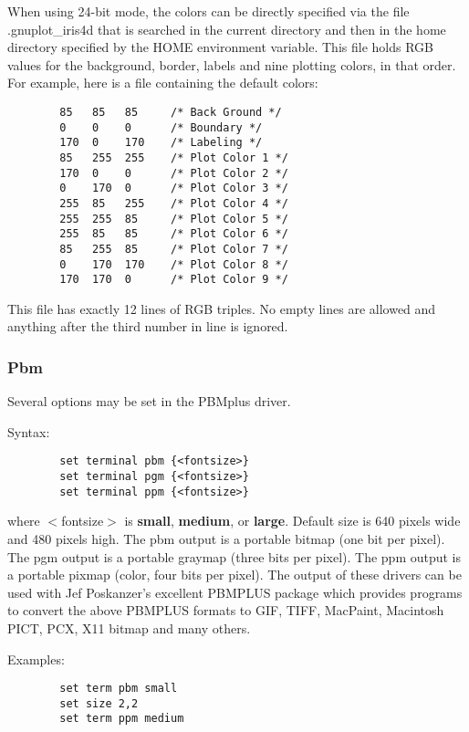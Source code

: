 When using 24-bit mode, the colors can be directly specified via the
file .gnuplot\_iris4d that is searched in the current directory and
then in the home directory specified by the HOME environment variable.
This file holds RGB values for the background, border, labels and nine
plotting colors, in that order. For example, here is a file containing
the default colors:

\begin{verbatim}
        85   85   85     /* Back Ground */
        0    0    0      /* Boundary */
        170  0    170    /* Labeling */
        85   255  255    /* Plot Color 1 */
        170  0    0      /* Plot Color 2 */
        0    170  0      /* Plot Color 3 */
        255  85   255    /* Plot Color 4 */
        255  255  85     /* Plot Color 5 */
        255  85   85     /* Plot Color 6 */
        85   255  85     /* Plot Color 7 */
        0    170  170    /* Plot Color 8 */
        170  170  0      /* Plot Color 9 */
\end{verbatim}

This file has exactly 12 lines of RGB triples. No empty lines are
allowed and anything after the third number in line is ignored.

\subsubsection{Pbm}
Several options may be set in the PBMplus driver.

Syntax:
\begin{verbatim}
        set terminal pbm {<fontsize>}
        set terminal pgm {<fontsize>}
        set terminal ppm {<fontsize>}
\end{verbatim}

where $<$fontsize$>$ is {\bf small}, {\bf medium}, or {\bf large}. 
Default size is 640 pixels wide and 480 pixels high.
The pbm output is a portable bitmap (one bit per pixel).
The pgm output is a portable graymap (three bits per pixel). 	
The ppm output is a portable pixmap (color, four bits per pixel).
The output of these drivers can be used with Jef Poskanzer's 
excellent PBMPLUS package which provides programs to convert
the above PBMPLUS formats to GIF, TIFF, MacPaint, Macintosh PICT,
PCX, X11 bitmap and many others. 

Examples:

\begin{verbatim}
        set term pbm small
        set size 2,2
        set term ppm medium
\end{verbatim}

